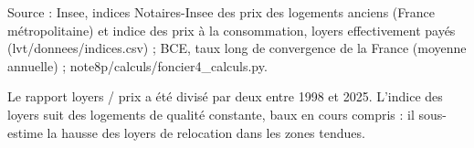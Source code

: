 Source : Insee, indices Notaires-Insee des prix des logements anciens (France métropolitaine) et indice des prix à la consommation, loyers effectivement payés (lvt/donnees/indices.csv) ; BCE, taux long de convergence de la France (moyenne annuelle) ; note8p/calculs/foncier4\_calculs.py.\par Le rapport loyers / prix a été divisé par deux entre 1998 et 2025. L'indice des loyers suit des logements de qualité constante, baux en cours compris : il sous-estime la hausse des loyers de relocation dans les zones tendues.
